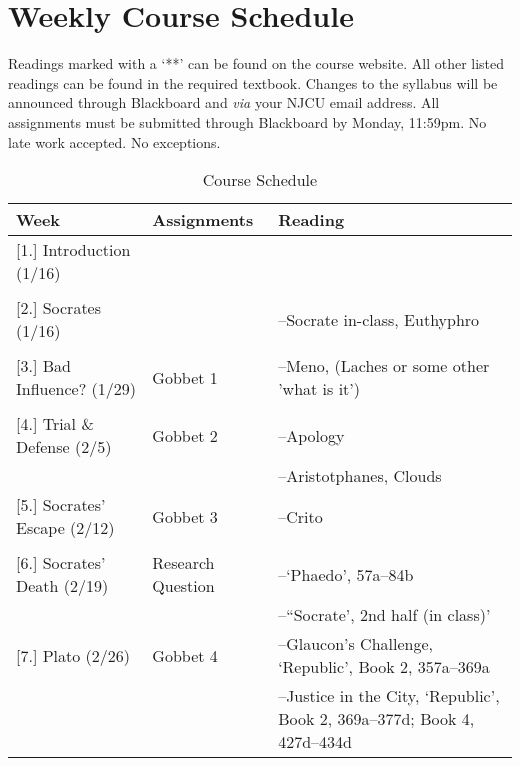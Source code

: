 \documentclass[article,oneside]{memoir}
\begin{document}
\section{Weekly Course Schedule}
Readings marked with a `**' can be found on the course website. All other listed readings can be found in the required textbook. Changes to the syllabus will be announced through Blackboard and \emph{via} your NJCU email address.  All assignments must be submitted through Blackboard by Monday, 11:59pm. No late work accepted. No exceptions.   \newline

\newpage

\begin{center}
\begin{longtable}{p{4.5cm}p{2cm}p{6cm}}
 
  \caption{Course Schedule} \\
  \toprule
  \textbf{Week} &\textbf{Assignments} & \textbf{Reading} \\
  \midrule

  

[1.] Introduction	(1/16)	  		& 	 			&   \\
					&		  		&    \\ [1.8\baselineskip]

[2.] Socrates (1/16)				& 				& --Socrate in-class, Euthyphro  \\
			        		&			  	&   \\  [1.8\baselineskip]

[3.] Bad Influence?	(1/29)		& Gobbet 1		  &  --Meno, (Laches or some other 'what is it') \\
			        &		  	    	&   \\[1.8\baselineskip]
	
[4.] Trial \& Defense (2/5)			& Gobbet 2		& --Apology \\
			        	& 			    	& --Aristotphanes, Clouds \\ [1.8\baselineskip]

[5.] Socrates' Escape (2/12)		& Gobbet 3		 & --Crito\\
				& 			    	&  \\ [1.8\baselineskip]

[6.] Socrates' Death	(2/19)	    	& Research Question & --`Phaedo', 57a--84b    \\
			        		& 				 & --``Socrate', 2nd half (in class)' \\ [1.8\baselineskip]
  
[7.] Plato (2/26)			 		& Gobbet 4		& --Glaucon's Challenge, `Republic', Book 2, 357a--369a  \\
				      	& 	      			& --Justice in the City, `Republic', Book 2, 369a--377d; Book 4, 427d--434d  \\  [1.8\baselineskip]


\end{longtable}
\end{center}
\end{document}
